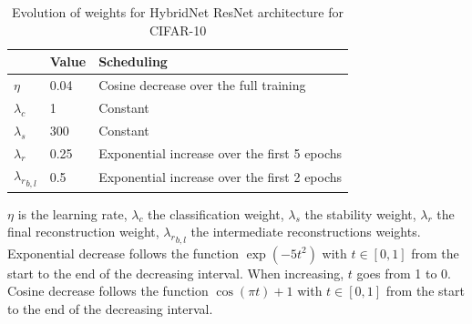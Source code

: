 \begin{table}[htbp]
\centering
\caption{Evolution of weights for HybridNet ResNet architecture for CIFAR-10}
\label{hybridnetA:table:resnetsched}
\begin{threeparttable}
\setlength{\tabcolsep}{4pt}
\begin{tabular}{ l l l}
\toprule
    & Value & Scheduling \\
\midrule
$\eta$ & 0.04 & Cosine decrease over the full training \\
$\lambda_c$ & 1 & Constant \\
$\lambda_s$ & 300 & Constant \\
$\lambda_r$ & 0.25 & Exponential increase over the first 5 epochs \\
${\lambda_r}_{b,l}$ & 0.5 & Exponential increase over the first 2 epochs \\
\bottomrule
\end{tabular}
\begin{tablenotes}
$\eta$ is the learning rate, $\lambda_c$ the classification weight, $\lambda_s$ the stability weight, $\lambda_r$ the final reconstruction weight, ${\lambda_r}_{b,l}$ the intermediate reconstructions weights.\\
Exponential decrease follows the function $\exp(-5t^2)$ with $t\in[0,1]$ from the start to the end of the decreasing interval. When increasing, $t$ goes from 1 to 0.\\
Cosine decrease follows the function $\cos(\pi t)+1$ with $t\in[0,1]$ from the start to the end of the decreasing interval.
\end{tablenotes}
\end{threeparttable}
\end{table}



